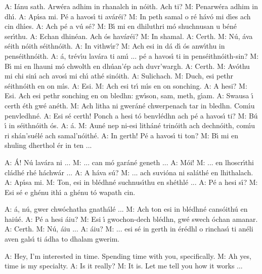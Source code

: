 A: I\'{a}nu sath. Arw\'{e}ra adhim in rhanalch in n\'{o}ith. Ach ti?
M: Penarw\'{e}ra adhim in dh\'{\i}.
A: Ap\'{\i}sa mi. P\'{e} a havos\'{\i} ti av\'{a}r\'{e}i?
M: In peth samal o r\'{e} h\'{a}v\'{o} mi d\'{\i}es ach cin dh\'{\i}es.
A: Ach p\'{e} a v\'{u} s\'{e}?
M: B\'{\i} mi en dhiluthri m\'{o} shuchnusan u b\'{e}n\'{e} ser\'{\i}thu.
A: Echan dhin\'{e}an. Ach \'{o}s hav\'{a}r\'{e}i?
M: In shamal.
A: Certh.
M: N\'{u}, \'{a}va s\'{e}ith n\'{o}ith s\'{e}ithn\'{o}ith.
A: In vithw\'{\i}r?
M: Ach esi in d\'{a} d\'{\i} \'{o}s anw\'{\i}thu in pens\'{e}ithn\'{o}ith.
A: \'{a}, tr\'{e}v\'{\i}u lav\'{a}ra ti am\'{\i} ... p\'{e} a havos\'{\i} ti in pens\'{e}ithn\'{o}ith-sin?
M: B\'{\i} mi en lhauni m\'{o} chwolth en dh\'{u}an’\'{e}p ach duvr’wargh.
A: Certh.
M: Av\'{o}thu mi chi sin\'{\i} ach avos\'{\i} mi ch\'{\i} ath\'{e} sin\'{o}ith.
A: Sulichach.
M: Duch, esi pethr s\'{e}ithn\'{o}ith en on m\'{\i}s.
A: Esi.
M: Ach esi tr\'{\i} m\'{\i}s en on sonching.
A: A hesi?
M: Esi. Ach esi pethr sonching en on bledhn: gw\'{\i}son, sam, meth, g\'{\i}am.
A: Swausa \'{\i} certh \'{e}th gw\'{e} an\'{e}th.
M: Ach litha ni gwer\'{a}n\'{e} chwerpenach tar in bledhn. Com\'{\i}u penvledhn\'{e}.
A: Esi s\'{e} certh! Ponch a hesi t\'{o} benvl\'{e}dhn ach p\'{e} a havos\'{\i} ti?
M: B\'{u} \'{\i} in s\'{e}ithn\'{o}ith \'{o}s.
A: \'{a}.
M: Aun\'{e} nep ni-esi lith\'{a}n\'{e} trin\'{o}ith ach dechn\'{o}ith, com\'{\i}u ri sh\'{a}n’su\'{e}l\'{e} ach samal’n\'{o}ith\'{e}.
A: In gerth! P\'{e} a havos\'{\i} ti ton?
M: B\'{\i} mi en shuling dherthol \'{e}r in ten ...

A: \'{A}! N\'{u} lav\'{a}ra ni ...
M: ... can m\'{o} gar\'{a}n\'{e} geneth ...
A: M\'{o}i!
M: ... en lhoscr\'{\i}thi cl\'{a}dh\'{e} rh\'{e} h\'{a}chw\'{a}r ...
A: A h\'{a}va s\'{u}?
M: ... ach suvi\'{o}na ni sal\'{a}th\'{e} en lhithalach.
A: Ap\'{\i}sa mi.
M: Ton, esi in bl\'{e}dhn\'{e} suchnus\'{\i}thu en sh\'{e}thl\'{e} ... 
A: P\'{e} a hesi s\'{\i}?
M: Esi s\'{e} e gh\'{e}nu ith\'{\i} a gh\'{e}nu t\'{o} wapath cin.

A: \'{a}, n\'{u}, gwer chw\'{o}chatha gnath\'{a}l\'{e} ...
M: Ach ton esi in bl\'{e}dhn\'{e} cans\'{o}ith\'{u} en hai\'{u}\'{e}.
A: P\'{e} a hesi \'{a}iu?
M: Esi \'{\i} gwochon-dech bl\'{e}dhn, gw\'{e} swech \'{o}chan amanar.
A: Certh.
M: N\'{u}, \'{a}iu ...
A: \'{a}iu?
M: ... esi s\'{e} in gerth in \'{e}r\'{e}dhl o rinchas\'{\i} ti an\'{e}li aven gals\'{\i} ti \'{a}dha to dhalam gwerim.

A: Hey, I’m interested in time. Spending time with you, specifically. 
M: Ah yes, time is my specialty.
A: Is it really?
M: It is. Let me tell you how it works ...

